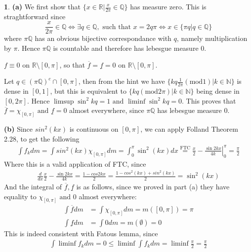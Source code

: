 \documentclass[10.5pt]{article}
\theoremstyle{definition}
\newtheorem{pb}{}
\newcommand{\set}[1]{\{#1\}}
\newcommand{\tand}{\text{ and }}
\begin{document}
\begin{pb}
    \textbf{(a)} We first show that \(\set{x \in \mathbb{R} \vert \frac{x}{2\pi} \in \mathbb{Q}}\) has measure zero. This is straghtforward since 
    \[\frac{x}{2\pi} \in \mathbb{Q} \iff \exists q \in \mathbb{Q}, \text{ such that } x = 2q\pi \iff x \in \set{\pi q \vert q \in \mathbb{Q}}\]
    where \(\pi \mathbb{Q}\) has an obvious bijective correspondance with \(q\), namely multiplication by \(\pi\). Hence \(\pi \mathbb{Q}\) is countable
    and therefore has lebesgue measure \(0\).

    \(f \equiv 0\) on \(\mathbb{R}\setminus[0,\pi]\), so that \(\overline{f} = \underline{f} = 0\) on \(\mathbb{R}\setminus[0,\pi]\).

    Let \(q \in (\pi \mathbb{Q})^c \cap[0,\pi]\), then from the hint we have \(\set{k q\frac{1}{2\pi} (\text{mod}1)\vert k \in \mathbb{N}}\) is dense in \([0,1]\), but this is equivalent to
    \(\set{kq (\text{mod}2\pi)\vert k \in \mathbb{N}}\) being dense in \([0,2\pi]\). Hence \(\limsup \sin^2 kq = 1 \tand \liminf \sin^2 kq = 0\). This proves that 
    \(\overline{f} = \chi_{[0,\pi]} \tand \underline{f} = 0\) almost everywhere, since \(\pi \mathbb{Q}\) has lebesgue measure \(0\).

    \textbf{(b)} 
    Since \(sin^2(kx)\) is continuous on \([0,\pi]\), we can apply Folland Theorem 2.28, to get the following
    \begin{align*}
        \int f_k dm = \int sin^2(kx)\chi_{[0,\pi]}dm = \int_0^\pi \sin^2(kx)dx \overset{\text{FTC}}{=} \left.\frac{x}{2} - \frac{\sin2kx}{4k}\right\vert_0^\pi = \frac{\pi}{2}
    \end{align*}
    Where this is a valid application of FTC, since
    \begin{align*}
        \frac{d}{dx} \frac{x}{2} - \frac{\sin2kx}{4k} = \frac{1 - cos2kx}{2} = \frac{1 - cos^2(kx) + sin^2(kx)}{2} = \sin^2(kx)
    \end{align*}
    And the integral of \(\overline{f}, \underline{f}\) is as follows, since we proved in part (a)  they have equality to \(\chi_{[0,\pi]} \tand 0\) almost everywhere:
    \begin{align*}
        \int \overline{f} dm &= \int \chi_{[0,\pi]} dm = m([0,\pi]) = \pi \\
        \int \underline{f} dm &= \int 0 dm = m(\emptyset) = 0
    \end{align*}
    This is indeed consistent with Fatous lemma, since
    \begin{align*}
        \int \liminf f_k dm = 0 \leq \liminf \int f_k dm = \liminf \frac{\pi}{2} = \frac{\pi}{2}
    \end{align*}
\end{pb}
\end{document}

